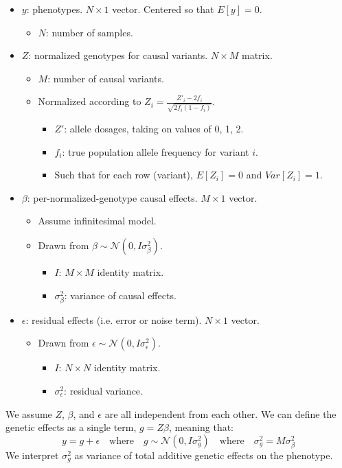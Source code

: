 \documentclass[12pt]{article}
\begin{document}
\begin{itemize}
    \item $y$: phenotypes.
    $N \times 1$ vector.
    Centered so that $E[y]=0$.
    \begin{itemize}
        \item $N$: number of samples.
    \end{itemize}
    \item $Z$: normalized genotypes for causal variants.
    $N \times M$ matrix.
    \begin{itemize}
        \item $M$: number of causal variants.
        \item Normalized according to
        $Z_i =  \frac{Z'_i - 2 f_i}{\sqrt{2 f_i (1 - f_i)}}$.
        \begin{itemize}
            \item $Z'$: allele dosages, taking on values of 0, 1, 2.
            \item $f_i$: true population allele frequency for variant $i$.
            \item Such that for each row (variant), $E[Z_i] = 0$ and $Var[Z_i] = 1$.
        \end{itemize}
    \end{itemize}
    \item $\beta$: per-normalized-genotype causal effects.
    $M \times 1$ vector.
    \begin{itemize}
        \item Assume infinitesimal model.
        \item Drawn from $\beta \sim \mathcal{N}(0, I \sigma_{\beta}^2)$.
        \begin{itemize}
            \item $I$: $M \times M$ identity matrix.
            \item $\sigma_{\beta}^2$: variance of causal effects.
        \end{itemize}
    \end{itemize}
    \item $\epsilon$: residual effects (i.e. error or noise term). $N \times 1$ vector.
    \begin{itemize}
        \item Drawn from $\epsilon \sim \mathcal{N}(0, I \sigma_{\epsilon}^2)$.
        \begin{itemize}
            \item $I$: $N \times N$ identity matrix.
            \item $\sigma_{\epsilon}^2$: residual variance.
        \end{itemize}
    \end{itemize}
\end{itemize}
We assume $Z$, $\beta$, and $\epsilon$ are all independent from each other.
We can define the genetic effects as a single term, $g = Z \beta$, meaning that:
\begin{equation*}
y = g + \epsilon
\quad\mathrm{where}\quad
g \sim \mathcal{N}(0, I \sigma_{g}^2)
\quad\mathrm{where}\quad
\sigma_{g}^2 = M \sigma_{\beta}^2
\end{equation*}
We interpret $\sigma_{g}^2$ as variance of total additive genetic effects on the phenotype.
\end{document}

